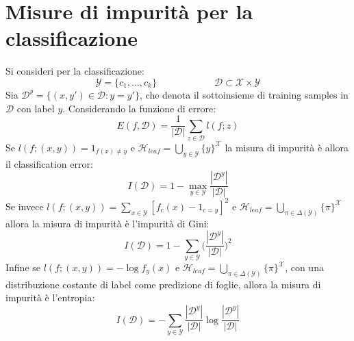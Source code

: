 \section{Misure di impurit\`a per la classificazione}
Si consideri per la classificazione:
$$\mathcal{Y} = \{c_1,\dots,c_k\}\qquad\qquad\qquad\mathcal{D}\subset\mathcal{X}\times\mathcal{Y}$$
Sia $\mathcal{D}^y = \{(x, y')\in \mathcal{D}: y = y'\}$, che denota il sottoinsieme di training samples in $\mathcal{D}$ con label $y$.
Considerando la funzione di errore:
$$E(f,\mathcal{D}) = \dfrac{1}{|\mathcal{D}|}\sum\limits_{z\in\mathcal{D}}l(f;z)$$
Se $l(f;(x,y))=1_{f(x)\neq y}$ e $\mathcal{H}_{leaf} = \bigcup\limits_{y\in\mathcal{Y}}\{y\}^\mathcal{X}$ la misura di impurit\`a \`e allora il classification error:
$$I(\mathcal{D})= 1 -\max\limits_{y\in\mathcal{Y}}\dfrac{|\mathcal{D}^y|}{|\mathcal{D}|}$$
Se invece $l(f;(x,y))=\sum\limits_{x\in\mathcal{Y}}[f_c(x)-1_{c=y}]^2$ e $\mathcal{H}_{leaf}=\bigcup\limits_{\pi\in\Delta(\mathcal{Y})}\{\pi\}^\mathcal{X}$ allora la misura di impurit\`a \`e l'impurit\`a di Gini:
$$I(\mathcal{D}) = 1-\sum\limits_{y\in\mathcal{Y}}\biggl(\dfrac{|\mathcal{D}^y|}{|\mathcal{D}|}\biggr)^2$$
Infine se $l(f;(x,y))=-\log f_y(x)$ e $\mathcal{H}_{leaf} = \bigcup\limits_{\pi\in\Delta(\mathcal{Y})}\{\pi\}^\mathcal{X}$, con una distribuzione costante di label come predizione di foglie, allora la misura di impurit\`a \`e l'entropia:
$$I(\mathcal{D})=-\sum\limits_{y\in\mathcal{Y}}\dfrac{|\mathcal{D}^y|}{|\mathcal{D}|}\log\dfrac{|\mathcal{D}^y|}{|\mathcal{D}|}$$


